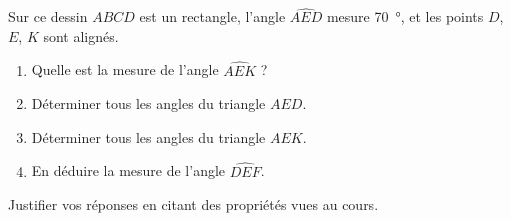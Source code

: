 
\begin{exercice}\label{exo2smath-0327}


    \begin{multicols}{2}

    Sur ce dessin \( ABCD\) est un rectangle, l'angle \( \widehat{AED}\) mesure \SI{70}{\degree}, et les points \( D\), \( E\), \( K\) sont alignés.
    \begin{enumerate}
        \item
            Quelle est la mesure de l'angle \( \widehat{AEK}\) ?
        \item
            Déterminer tous les angles du triangle \( AED\).
        \item
            Déterminer tous les angles du triangle \( AEK\).
        \item
            En déduire la mesure de l'angle \( \widehat{DEF}\).
    \end{enumerate}
    Justifier vos réponses en citant des propriétés vues au cours.

\columnbreak

\begin{center}

\end{center}

    \end{multicols}

\end{exercice}
